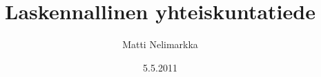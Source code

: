 \documentclass[finnish,gradu,twoside]{tktltiki}
\begin{document}
\onehalfspacing

\title{Laskennallinen yhteiskuntatiede}
\author{Matti Nelimarkka}
\date{5.5.2011}

\numberofpagesinformation{}

\keywords{}

\maketitle

\begin{abstract}
\end{abstract}

\mytableofcontents
\end{document}
